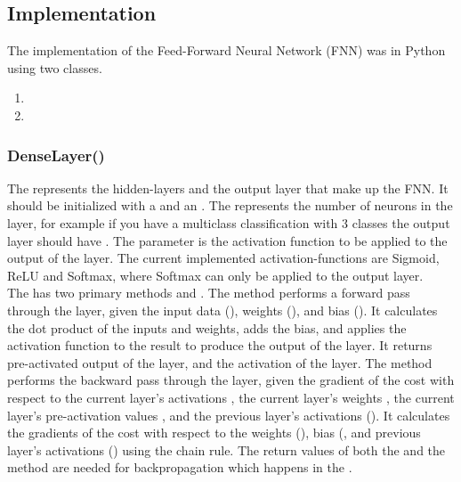 \subsection{Implementation}
The implementation of the Feed-Forward Neural Network (FNN) was in Python using two classes.\\
\begin{enumerate}
    \item {}
    \item {}
    \end{enumerate}
\vspace{10pt}

\subsubsection{DenseLayer()}
The  represents the hidden-layers and the output layer that make up the FNN.
It should be initialized with a  and an .
The  represents the number of neurons in the layer, for example
if you have a multiclass classification with 3 classes the output layer should have .
The  parameter is the activation function to be applied to the output of the layer.
The current implemented activation-functions are Sigmoid, ReLU and Softmax, where Softmax can only be applied to the output layer.\\

The  has two primary methods  and .
The  method performs a forward pass through the layer, given the input data (), weights (), and bias ().
It calculates the dot product of the inputs and weights, adds the bias, and applies the activation function to the result to produce the output of the layer.
It returns pre-activated output of the layer, and the activation of the layer.
The  method performs the backward pass through the layer, given the gradient of the cost with respect to the current layer's activations , the current layer's weights , the current layer's pre-activation values , and the previous layer's activations ().
It calculates the gradients of the cost with respect to the weights (), bias (, and previous layer's activations () using the chain rule.
The return values of both the  and the  method are needed for backpropagation which happens in the .


